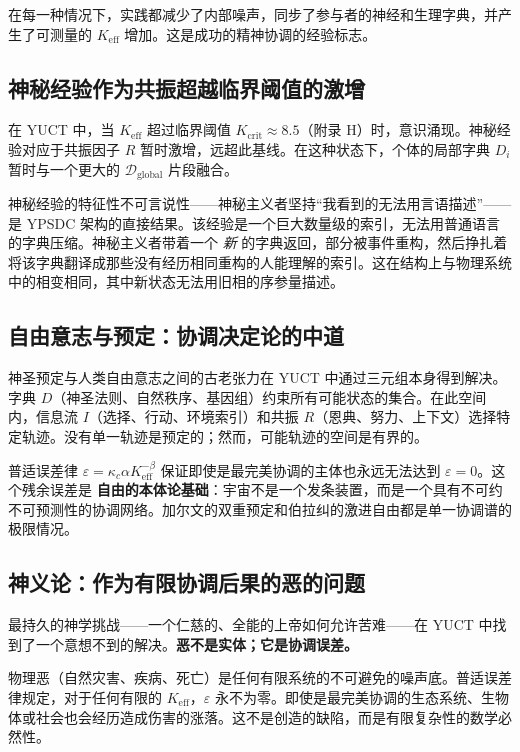 \documentclass[12pt,a4paper]{article}
\begin{document}
	在每一种情况下，实践都减少了内部噪声，同步了参与者的神经和生理字典，并产生了可测量的 \(K_{\mathrm{eff}}\) 增加。这是成功的精神协调的经验标志。
	
	\subsection{神秘经验作为共振超越临界阈值的激增}
	
	在 YUCT 中，当 \(K_{\mathrm{eff}}\) 超过临界阈值 \(K_{\mathrm{crit}} \approx 8.5\)（附录 H）时，意识涌现。神秘经验对应于共振因子 \(R\) 暂时激增，远超此基线。在这种状态下，个体的局部字典 \(D_i\) 暂时与一个更大的 \(\mathcal{D}_{\text{global}}\) 片段融合。
	
	神秘经验的特征性不可言说性——神秘主义者坚持“我看到的无法用言语描述”——是 YPSDC 架构的直接结果。该经验是一个巨大数量级的索引，无法用普通语言的字典压缩。神秘主义者带着一个 \emph{新} 的字典返回，部分被事件重构，然后挣扎着将该字典翻译成那些没有经历相同重构的人能理解的索引。这在结构上与物理系统中的相变相同，其中新状态无法用旧相的序参量描述。
	
	\subsection{自由意志与预定：协调决定论的中道}
	
	神圣预定与人类自由意志之间的古老张力在 YUCT 中通过三元组本身得到解决。字典 \(D\)（神圣法则、自然秩序、基因组）约束所有可能状态的集合。在此空间内，信息流 \(I\)（选择、行动、环境索引）和共振 \(R\)（恩典、努力、上下文）选择特定轨迹。没有单一轨迹是预定的；然而，可能轨迹的空间是有界的。
	
	普适误差律 \(\varepsilon = \kappa_c \alpha K_{\mathrm{eff}}^{-\beta}\) 保证即使是最完美协调的主体也永远无法达到 \(\varepsilon = 0\)。这个残余误差是 \textbf{自由的本体论基础}：宇宙不是一个发条装置，而是一个具有不可约不可预测性的协调网络。加尔文的双重预定和伯拉纠的激进自由都是单一协调谱的极限情况。
	
	\subsection{神义论：作为有限协调后果的恶的问题}
	
	最持久的神学挑战——一个仁慈的、全能的上帝如何允许苦难——在 YUCT 中找到了一个意想不到的解决。\textbf{恶不是实体；它是协调误差。}
	
	物理恶（自然灾害、疾病、死亡）是任何有限系统的不可避免的噪声底。普适误差律规定，对于任何有限的 \(K_{\mathrm{eff}}\)，\(\varepsilon\) 永不为零。即使是最完美协调的生态系统、生物体或社会也会经历造成伤害的涨落。这不是创造的缺陷，而是有限复杂性的数学必然性。
	
\end{document}
